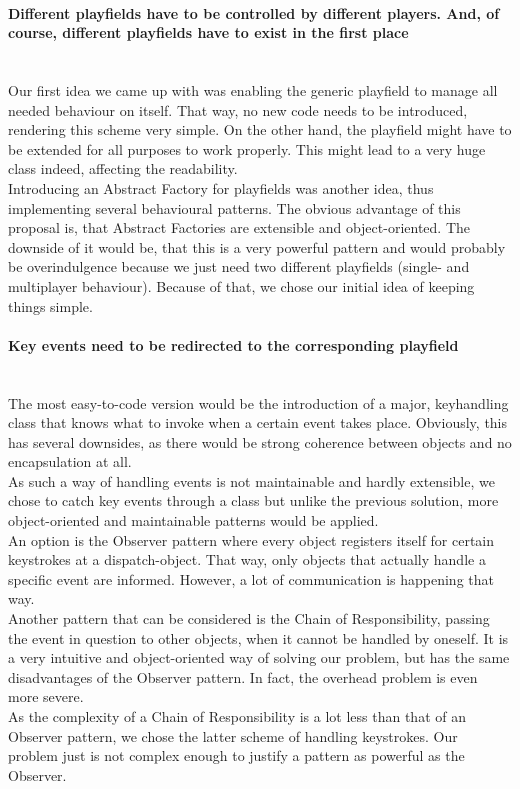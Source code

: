   \paragraph{Different playfields have to be controlled by different players.
             And, of course, different playfields have to exist in the first place}
  ~\\
    Our first idea we came up with was enabling the generic playfield to manage all needed behaviour
    on itself. That way, no new code needs to be introduced, rendering this scheme very simple.
    On the other hand, the playfield might have to be extended for all purposes to work properly. 
    This might lead to a very huge class indeed, affecting the readability.\\
    Introducing an Abstract Factory for playfields was another idea, thus implementing several 
    behavioural patterns. The obvious advantage of this proposal is, that Abstract Factories 
    are extensible and object-oriented. The downside of it would be, that this is a very powerful 
    pattern and would probably be overindulgence because we just need two different playfields 
    (single- and multiplayer behaviour). Because of that, we chose our initial idea of keeping 
    things simple.

  \paragraph{Key events need to be redirected to the corresponding playfield}
  ~\\
    The most easy-to-code version would be the introduction of a major, keyhandling class that
    knows what to invoke when a certain event takes place. Obviously, this has several downsides,
    as there would be strong coherence between objects and no encapsulation at all.\\
    As such a way of handling events is not maintainable and hardly extensible, we chose to catch
    key events through a class but unlike the previous solution, more object-oriented and maintainable
    patterns would be applied.\\
    An option is the Observer pattern where every object registers itself for certain keystrokes at
    a dispatch-object. That way, only objects that actually handle a specific event are informed.
    However, a lot of communication is happening that way.\\
    Another pattern that can be considered is the Chain of Responsibility, passing the event
    in question to other objects, when it cannot be handled by oneself. It is a very intuitive
    and object-oriented way of solving our problem, but has the same disadvantages of the 
    Observer pattern. In fact, the overhead problem is even more severe.\\
    As the complexity of a Chain of Responsibility is a lot less than that of an Observer pattern,
    we chose the latter scheme of handling keystrokes. Our problem just is not complex enough
    to justify a pattern as powerful as the Observer.
%

